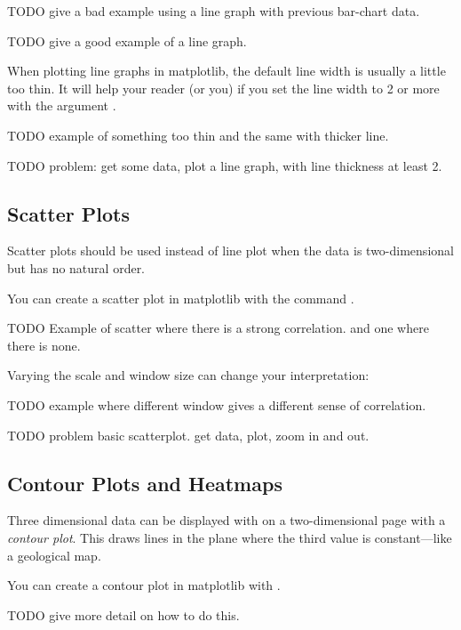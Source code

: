 TODO give a bad example using a line graph with previous bar-chart data.

TODO give a good example of a line graph.

When plotting line graphs in matplotlib, the default line width is usually a little too thin.  It will help your reader (or you) if you set the line width to 2 or more with the argument .


TODO example of something too thin and the same with thicker line.

\begin{problem}
TODO problem: get some data, plot a line graph, with line thickness at least 2.  
\end{problem}




\subsection*{Scatter Plots} 

Scatter plots should be used instead of line plot when the data is two-dimensional but has no natural order. 
 
 You can create a scatter plot in matplotlib with the command .
 
TODO Example of scatter where there is a strong correlation. and one where there is none.

Varying the scale and window size can change your interpretation:

TODO example where different window gives a different sense of correlation.

\begin{problem}
TODO problem basic scatterplot. get data, plot, zoom in and out.
\end{problem}




\subsection*{Contour Plots and Heatmaps}

Three dimensional data can be displayed with on a two-dimensional page with a \emph{contour plot}.  This draws lines in the plane where the third value is constant---like a geological map.  

You can create a contour plot in matplotlib with 
.

TODO give more detail on how to do this.

